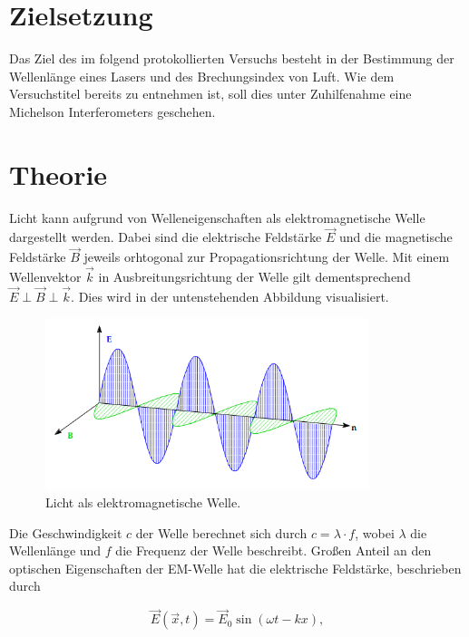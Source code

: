 
\usepackage{wrapfig}



\section{Zielsetzung}
\label{Zielsetzung}

\noindent Das Ziel des im folgend protokollierten Versuchs besteht in der Bestimmung der Wellenlänge eines Lasers und des 
Brechungsindex von Luft. Wie dem Versuchstitel bereits zu entnehmen ist, soll dies unter Zuhilfenahme eine Michelson 
Interferometers geschehen.

\section{Theorie}
\label{sec:Theorie}

Licht kann aufgrund von Welleneigenschaften als elektromagnetische Welle dargestellt werden. Dabei sind die elektrische 
Feldstärke $\vec{E}$ und die magnetische Feldstärke $\vec{B}$ jeweils orhtogonal zur Propagationsrichtung der Welle. Mit einem 
Wellenvektor $\vec{k}$ in Ausbreitungsrichtung der Welle gilt dementsprechend $\vec{E} \perp \vec{B} \perp \vec{k}$. Dies wird in 
der untenstehenden Abbildung visualisiert.

\begin{figure}
    \centering
    \includegraphics[height=5cm]{EM_Welle.png}
    \caption{Licht als elektromagnetische Welle\cite{Versuchsanleitung_v401}.}
    \label{fig:EMWelle}
\end{figure}

\noindent Die Geschwindigkeit $c$ der Welle berechnet sich durch $c = \lambda\cdot{}f$, wobei $\lambda$ die Wellenlänge und $f$ die Frequenz 
der Welle beschreibt. Großen Anteil an den optischen Eigenschaften der EM-Welle hat die elektrische Feldstärke, beschrieben durch 

\begin{equation*}
    \vec{E}\left(\vec{x},t\right) = \vec{E}_0\sin\left(\omega{}t - kx\right),
\end{equation*}

